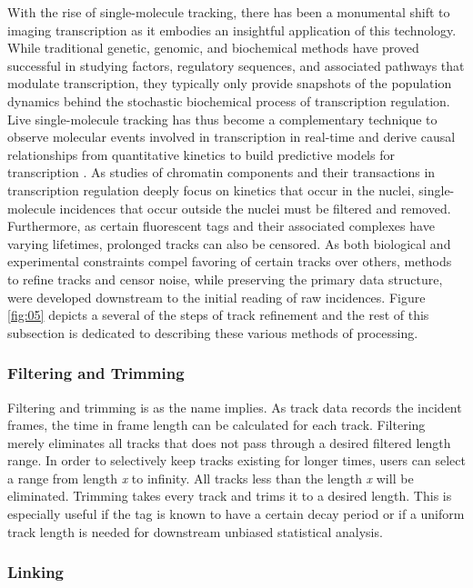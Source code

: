 \documentclass{bioinfo}
\begin{document}
With the rise of single-molecule tracking, there has been a monumental shift to imaging transcription as it embodies an insightful application of this technology. While traditional genetic, genomic, and biochemical methods have proved successful in studying factors, regulatory sequences, and associated pathways that modulate transcription, they typically only provide snapshots of the population dynamics behind the stochastic biochemical process of transcription regulation. Live single-molecule tracking has thus become a complementary technique to observe molecular events involved in transcription in real-time and derive causal relationships from quantitative kinetics to build predictive models for transcription \citep{Coleman}. As studies of chromatin components and their transactions in transcription regulation deeply focus on kinetics that occur in the nuclei, single-molecule incidences that occur outside the nuclei must be filtered and removed. Furthermore, as certain fluorescent tags and their associated complexes have varying lifetimes, prolonged tracks can also be censored. As both biological and experimental constraints compel favoring of certain tracks over others, methods to refine tracks and censor noise, while preserving the primary data structure, were developed downstream to the initial reading of raw incidences. Figure \ref{fig:05} depicts a several of the steps of track refinement and the rest of this subsection is dedicated to describing these various methods of processing.


\subsubsection{Filtering and Trimming}

Filtering and trimming is as the name implies. As track data records the incident frames, the time in frame length can be calculated for each track. Filtering merely eliminates all tracks that does not pass through a desired filtered length range. In order to selectively keep tracks existing for longer times, users can select a range from length \textit{x} to infinity. All tracks less than the length \textit{x} will be eliminated. Trimming takes every track and trims it to a desired length. This is especially useful if the tag is known to have a certain decay period or if a uniform track length is needed for downstream unbiased statistical analysis.


\subsubsection{Linking}
\end{document}
